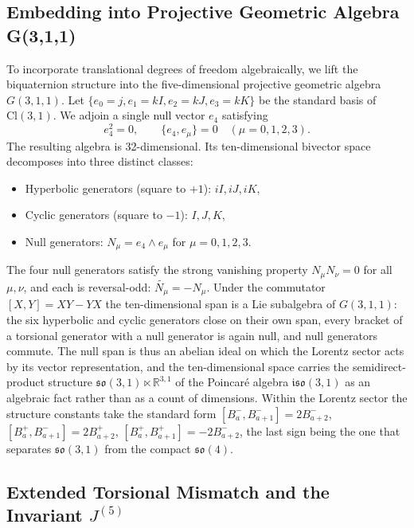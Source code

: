 \documentclass[a4paper]{article}
\theoremstyle{definition}
\theoremstyle{remark}
\begin{document}
\subsection{Embedding into Projective Geometric Algebra G(3,1,1)}

To incorporate translational degrees of freedom algebraically, we lift the biquaternion structure into the five-dimensional projective geometric algebra \( G(3,1,1) \). Let \( \{e_0 = j, e_1 = kI, e_2 = kJ, e_3 = kK\} \) be the standard basis of \( \mathrm{Cl}(3,1) \). We adjoin a single null vector \( e_4 \) satisfying
\[
e_4^2 = 0, \qquad \{e_4, e_\mu\} = 0 \quad (\mu = 0,1,2,3).
\]
The resulting algebra is 32-dimensional. Its ten-dimensional bivector space decomposes into three distinct classes:
\begin{itemize}
  \item Hyperbolic generators (square to \( +1 \)): \( iI, iJ, iK \),
  \item Cyclic generators (square to \( -1 \)): \( I, J, K \),
  \item Null generators: \( N_\mu = e_4 \wedge e_\mu \) for \( \mu = 0,1,2,3 \).
\end{itemize}
The four null generators satisfy the strong vanishing property \( N_\mu N_\nu = 0 \) for all \( \mu,\nu \), and each is reversal-odd: \( \widetilde{N_\mu} = -N_\mu \). Under the commutator \([X,Y]=XY-YX\) the ten-dimensional span is a Lie subalgebra of \( G(3,1,1) \): the six hyperbolic and cyclic generators close on their own span, every bracket of a torsional generator with a null generator is again null, and null generators commute. The null span is thus an abelian ideal on which the Lorentz sector acts by its vector representation, and the ten-dimensional space carries the semidirect-product structure \( \mathfrak{so}(3,1)\ltimes\mathbb{R}^{3,1} \) of the Poincaré algebra \( \mathfrak{iso}(3,1) \) as an algebraic fact rather than as a count of dimensions. Within the Lorentz sector the structure constants take the standard form \([B^-_a,B^-_{a+1}]=2B^-_{a+2}\), \([B^+_a,B^-_{a+1}]=2B^+_{a+2}\), \([B^+_a,B^+_{a+1}]=-2B^-_{a+2}\), the last sign being the one that separates \(\mathfrak{so}(3,1)\) from the compact \(\mathfrak{so}(4)\).

\subsection{Extended Torsional Mismatch and the Invariant \texorpdfstring{\( J^{(5)} \)}{J}}
\end{document}
